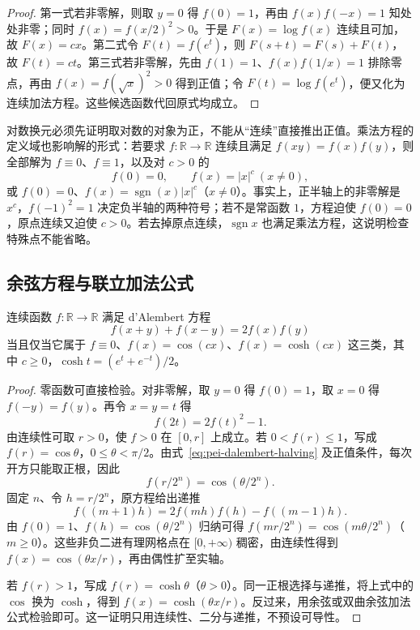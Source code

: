 \begin{proof}
第一式若非零解，则取 $y=0$ 得 $f(0)=1$，再由 $f(x)f(-x)=1$ 知处处非零；同时 $f(x)=f(x/2)^2>0$。于是 $F(x)=\log f(x)$ 连续且可加，故 $F(x)=cx$。第二式令 $F(t)=f(e^t)$，则 $F(s+t)=F(s)+F(t)$，故 $F(t)=ct$。第三式若非零解，先由 $f(1)=1$、$f(x)f(1/x)=1$ 排除零点，再由 $f(x)=f(\sqrt{x})^2>0$ 得到正值；令 $F(t)=\log f(e^t)$，便又化为连续加法方程。这些候选函数代回原式均成立。
\end{proof}

对数换元必须先证明取对数的对象为正，不能从“连续”直接推出正值。乘法方程的定义域也影响解的形式：若要求 $f:\mathbb R\to\mathbb R$ 连续且满足 $f(xy)=f(x)f(y)$，则全部解为 $f\equiv0$、$f\equiv1$，以及对 $c>0$ 的
\[
f(0)=0,\qquad f(x)=|x|^c\ (x\ne0),
\]
或 $f(0)=0$、$f(x)=\operatorname{sgn}(x)|x|^c$（$x\ne0$）。事实上，正半轴上的非零解是 $x^c$，$f(-1)^2=1$ 决定负半轴的两种符号；若不是常函数 $1$，方程迫使 $f(0)=0$，原点连续又迫使 $c>0$。若去掉原点连续，$\operatorname{sgn}x$ 也满足乘法方程，这说明检查特殊点不能省略。

\subsection{余弦方程与联立加法公式}

\begin{theorem}
\label{thm:pei-dalembert}
连续函数 $f:\mathbb R\to\mathbb R$ 满足 d'Alembert 方程
\begin{equation}
\label{eq:pei-dalembert}
f(x+y)+f(x-y)=2f(x)f(y)
\end{equation}
当且仅当它属于 $f\equiv0$、$f(x)=\cos(cx)$、$f(x)=\cosh(cx)$ 这三类，其中 $c\ge0$，$\cosh t=(e^t+e^{-t})/2$。
\end{theorem}

\begin{proof}
零函数可直接检验。对非零解，取 $y=0$ 得 $f(0)=1$，取 $x=0$ 得 $f(-y)=f(y)$。再令 $x=y=t$ 得
\begin{equation}
\label{eq:pei-dalembert-halving}
f(2t)=2f(t)^2-1.
\end{equation}
由连续性可取 $r>0$，使 $f>0$ 在 $[0,r]$ 上成立。若 $0<f(r)\le1$，写成 $f(r)=\cos\theta$，$0\le\theta<\pi/2$。由式~\eqref{eq:pei-dalembert-halving} 及正值条件，每次开方只能取正根，因此
\[
f(r/2^n)=\cos(\theta/2^n).
\]
固定 $n$、令 $h=r/2^n$，原方程给出递推
\[
f((m+1)h)=2f(mh)f(h)-f((m-1)h).
\]
由 $f(0)=1$、$f(h)=\cos(\theta/2^n)$ 归纳可得 $f(mr/2^n)=\cos(m\theta/2^n)$（$m\ge0$）。这些非负二进有理网格点在 $[0,+\infty)$ 稠密，由连续性得到 $f(x)=\cos(\theta x/r)$，再由偶性扩至实轴。

若 $f(r)>1$，写成 $f(r)=\cosh\theta$（$\theta>0$）。同一正根选择与递推，将上式中的 $\cos$ 换为 $\cosh$，得到 $f(x)=\cosh(\theta x/r)$。反过来，用余弦或双曲余弦加法公式检验即可。这一证明只用连续性、二分与递推，不预设可导性。
\end{proof}

